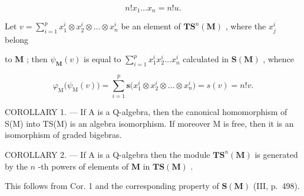 \[
n! x _ {1} \dots x _ {n} = n! u.
\]

Let \(v = \sum_{i=1}^{p} x_1^i \otimes x_2^i \otimes \ldots \otimes x_n^i\) be an element of \(\mathbf{TS}^n(\mathbf{M})\) , where the \(x_j^i\) belong

to \(\mathbf{M}\) ; then \(\psi_{\mathbf{M}}(v)\) is equal to \(\sum_{i=1}^{p} x_1^i x_2^i \ldots x_n^i\) calculated in \(\mathbf{S}(\mathbf{M})\) , whence

\[
\varphi_ {\mathrm{M}} \big (\psi_ {\mathrm{M}} (v) \big) = \sum_ {i = 1} ^ {p} \mathbf {s} \big (x _ {1} ^ {i} \otimes x _ {2} ^ {i} \otimes \dots \otimes x _ {n} ^ {i} \big) = s (v) = n! v.
\]

COROLLARY 1. --- If A is a Q-algebra, then the canonical homomorphism of S(M) into TS(M) is an algebra isomorphism. If moreover M is free, then it is an isomorphism of graded bigebras.

COROLLARY 2. --- If A is a Q-algebra then the module \(\mathbf{TS}^n (\mathbf{M})\) is generated by the \(n\) -th powers of elements of \(\mathbf{M}\) in \(\mathbf{TS}(\mathbf{M})\) .

This follows from Cor. 1 and the corresponding property of \(\mathbf{S}(\mathbf{M})\) (III, p.~498).

